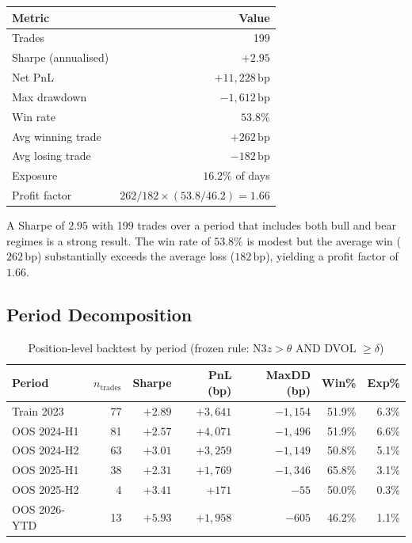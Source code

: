 \documentclass[12pt, a4paper]{article}
\theoremstyle{plain}
\theoremstyle{definition}
\newcommand{\bp}{\,\mathrm{bp}}
\begin{document}
\begin{center}
\begin{tabular}{lr}
\toprule
Metric & Value \\
\midrule
Trades              & 199 \\
Sharpe (annualised) & $+2.95$ \\
Net PnL             & $+11{,}228\bp$ \\
Max drawdown        & $-1{,}612\bp$ \\
Win rate            & $53.8\%$ \\
Avg winning trade   & $+262\bp$ \\
Avg losing trade    & $-182\bp$ \\
Exposure            & $16.2\%$ of days \\
Profit factor       & $262/182 \times (53.8/46.2) = 1.66$ \\
\bottomrule
\end{tabular}
\end{center}

A Sharpe of $2.95$ with 199 trades over a period that includes both
bull and bear regimes is a strong result. The win rate of $53.8\%$
is modest but the average win ($262\bp$) substantially exceeds the
average loss ($182\bp$), yielding a profit factor of $1.66$.

\subsection{Period Decomposition}

\begin{table}[H]
\centering
\caption{Position-level backtest by period (frozen rule: N3$z > \theta$ AND DVOL $\geq \delta$)}
\label{tab:backtest_periods}
\begin{tabular}{lrrrrrr}
\toprule
Period & $n_{\text{trades}}$ & Sharpe & PnL (bp) & MaxDD (bp) & Win\% & Exp\% \\
\midrule
Train 2023   & 77  & $+2.89$ & $+3{,}641$ & $-1{,}154$ & 51.9\% & 6.3\% \\
OOS 2024-H1  & 81  & $+2.57$ & $+4{,}071$ & $-1{,}496$ & 51.9\% & 6.6\% \\
OOS 2024-H2  & 63  & $+3.01$ & $+3{,}259$ & $-1{,}149$ & 50.8\% & 5.1\% \\
OOS 2025-H1  & 38  & $+2.31$ & $+1{,}769$ & $-1{,}346$ & 65.8\% & 3.1\% \\
OOS 2025-H2  & 4   & $+3.41$ & $+171$     & $-55$      & 50.0\% & 0.3\% \\
OOS 2026-YTD & 13  & $+5.93$ & $+1{,}958$ & $-605$     & 46.2\% & 1.1\% \\
\bottomrule
\end{tabular}
\end{table}
\end{document}

